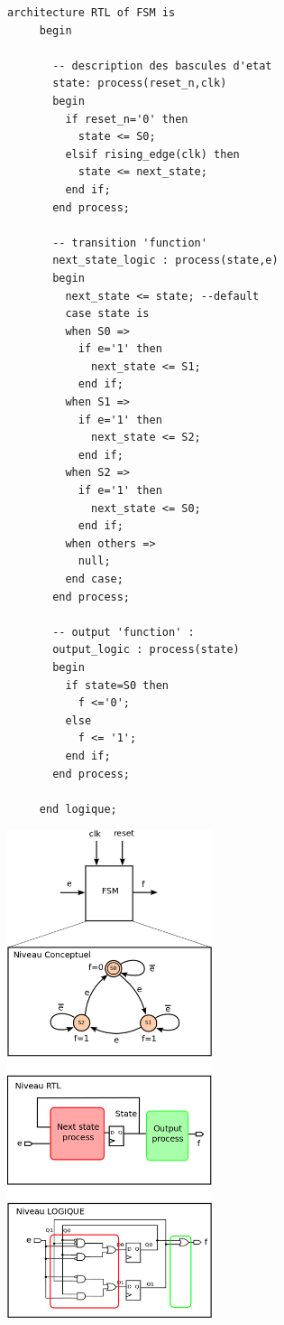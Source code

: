 \begin{center}
   \begin{minipage}[t]{9cm}
     \vspace{0pt}
     \begin{lstlisting}[frame=single]
     architecture RTL of FSM is
     begin

       -- description des bascules d'etat
       state: process(reset_n,clk)
       begin
         if reset_n='0' then
           state <= S0;
         elsif rising_edge(clk) then
           state <= next_state;
         end if;
       end process;

       -- transition 'function'
       next_state_logic : process(state,e)
       begin
         next_state <= state; --default
         case state is
         when S0 =>
           if e='1' then
             next_state <= S1;
           end if;
         when S1 =>
           if e='1' then
             next_state <= S2;
           end if;
         when S2 =>
           if e='1' then
             next_state <= S0;
           end if;
         when others =>
           null;
         end case;
       end process;

       -- output 'function' :
       output_logic : process(state)
       begin
         if state=S0 then
           f <='0';
         else
           f <= '1';
         end if;
       end process;

     end logique;
     \end{lstlisting}
   \end{minipage}%
   \begin{minipage}[t]{7cm}
     \vspace{40pt}
     \centering
     \includegraphics[width=6cm]{./figures/exo_fsm_expanded.png}
   \end{minipage}
\end{center} %

